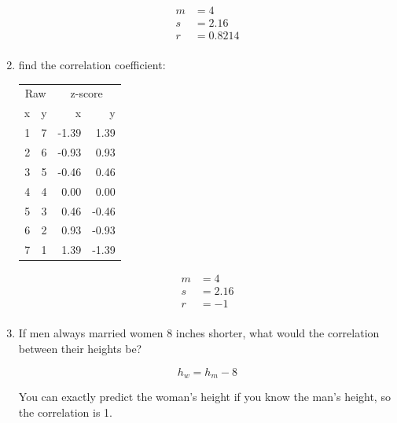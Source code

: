 \documentclass[landscape]{exam}
\begin{document}
\begin{enumerate}
    \begin{solution}
      \begin{align*}
        m &= 4 \\
        s &= 2.16 \\
        r &= 0.8214 \\
      \end{align*}
    \end{solution}

    \item find the correlation coefficient:
      \begin{table}[H]
      \centering
      \begin{tabular}{rrrr}
        \toprule
        \multicolumn{2}{c}{Raw} & \multicolumn{2}{c}{z-score } \\
        \cmidrule(r){1-2} \cmidrule(r){3-4} 
        x & y & x     & y \\
        \midrule
        1 & 7 & -1.39 & 1.39 \\ 
        2 & 6 & -0.93 & 0.93 \\ 
        3 & 5 & -0.46 & 0.46 \\ 
        4 & 4 & 0.00 & 0.00 \\ 
        5 & 3 & 0.46 & -0.46 \\ 
        6 & 2 & 0.93 & -0.93 \\ 
        7 & 1 & 1.39 & -1.39 \\ 
        \bottomrule
      \end{tabular}
      \end{table}

    \begin{solution}
      \begin{align*}
        m &= 4 \\
        s &= 2.16 \\
        r &= -1 \\
      \end{align*}
    \end{solution}

    \item If men always married women 8 inches shorter, what would the
      correlation between their heights be?
      
      \begin{solution}
        \[
          h_w = h_m - 8
        \]

        You can exactly predict the woman's height if you know the man's
        height, so the correlation is 1.


\end{solution}
\end{enumerate}
\end{document}
